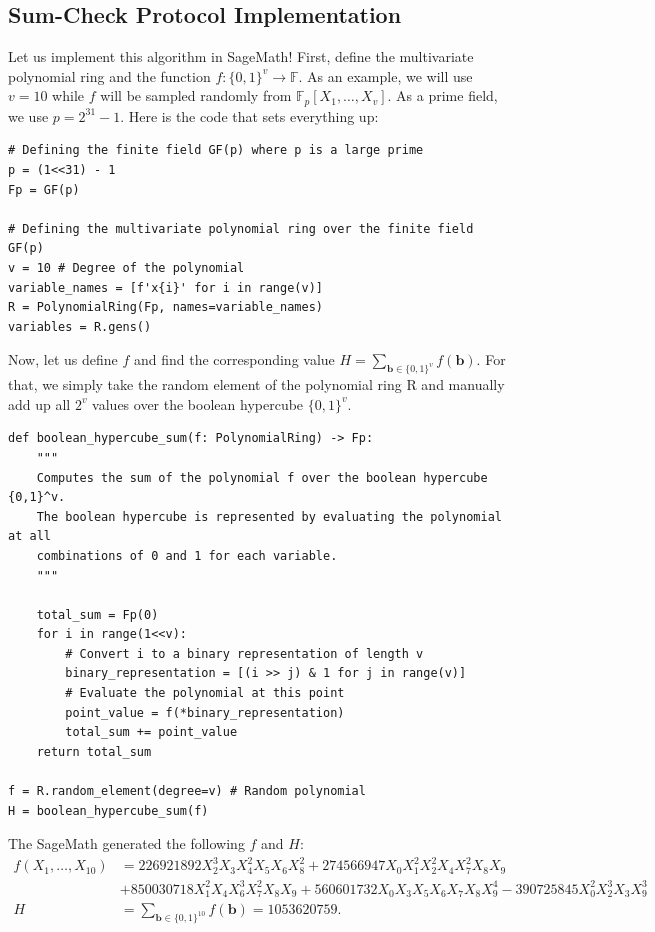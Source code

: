 \documentclass{gkr-template}
\begin{document}
\subsection*{Sum-Check Protocol Implementation}

Let us implement this algorithm in SageMath! First, define the multivariate
polynomial ring and the function $f: \{0,1\}^v \to \mathbb{F}$. As an example,
we will use $v=10$ while $f$ will be sampled randomly from
$\mathbb{F}_p[X_1,\dots,X_v]$. As a prime field, we use $p=2^{31} - 1$. 
Here is the code that sets everything up:
\begin{verbatim}
# Defining the finite field GF(p) where p is a large prime
p = (1<<31) - 1
Fp = GF(p)

# Defining the multivariate polynomial ring over the finite field GF(p)
v = 10 # Degree of the polynomial
variable_names = [f'x{i}' for i in range(v)]
R = PolynomialRing(Fp, names=variable_names)
variables = R.gens()
\end{verbatim}

Now, let us define $f$ and find the corresponding value $H =
\sum_{\boldsymbol{b} \in \{0,1\}^v} f(\boldsymbol{b})$. For that, we
simply take the random element of the polynomial ring \textsf{R} and 
manually add up all $2^v$ values over the boolean hypercube $\{0,1\}^v$.
\begin{verbatim}
def boolean_hypercube_sum(f: PolynomialRing) -> Fp:
    """
    Computes the sum of the polynomial f over the boolean hypercube {0,1}^v.
    The boolean hypercube is represented by evaluating the polynomial at all
    combinations of 0 and 1 for each variable.
    """

    total_sum = Fp(0)
    for i in range(1<<v):
        # Convert i to a binary representation of length v
        binary_representation = [(i >> j) & 1 for j in range(v)]
        # Evaluate the polynomial at this point
        point_value = f(*binary_representation)
        total_sum += point_value
    return total_sum

f = R.random_element(degree=v) # Random polynomial
H = boolean_hypercube_sum(f)
\end{verbatim}

The SageMath generated the following $f$ and $H$:
\begin{align*}
    f(X_1,\dots,X_{10}) &= 226921892X_2^3X_3X_4^2X_5X_6X_8^2 + 274566947X_0X_1^2X_2^2X_4X_7^2X_8X_9 \\ 
    &+ 850030718X_1^2X_4X_6^3X_7^2X_8X_9 + 560601732X_0X_3X_5X_6X_7X_8X_9^4 - 390725845X_0^2X_2^3X_3X_9^3 \\
    H &= \sum_{\boldsymbol{b} \in \{0,1\}^{10}} f(\boldsymbol{b}) = 1053620759.
\end{align*}
\end{document}
